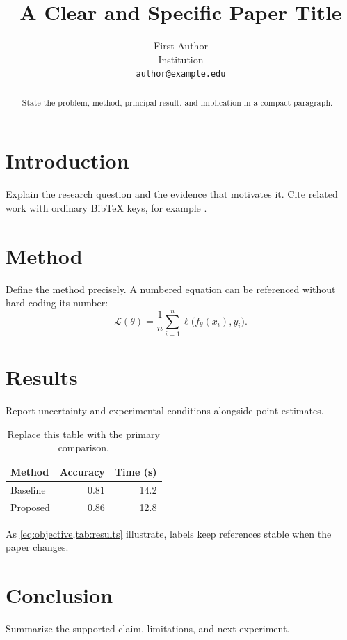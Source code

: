 \documentclass[11pt]{article}
\title{A Clear and Specific Paper Title}
\author{First Author \\ Institution \\ \texttt{author@example.edu}}
\date{}
\begin{document}
\maketitle

\begin{abstract}
State the problem, method, principal result, and implication in a compact
paragraph.
\end{abstract}

\section{Introduction}
\label{sec:introduction}

Explain the research question and the evidence that motivates it. Cite related
work with ordinary BibTeX keys, for example \cite{lamport1994latex}.

\section{Method}
\label{sec:method}

Define the method precisely. A numbered equation can be referenced without
hard-coding its number:
\begin{equation}
  \label{eq:objective}
  \mathcal{L}(\theta) = \frac{1}{n}\sum_{i=1}^{n}
  \ell\bigl(f_{\theta}(x_i), y_i\bigr).
\end{equation}

\section{Results}
\label{sec:results}

Report uncertainty and experimental conditions alongside point estimates.

\begin{table}[t]
  \centering
  \caption{Replace this table with the primary comparison.}
  \label{tab:results}
  \begin{tabular}{lrr}
    \toprule
    Method & Accuracy & Time (s) \\
    \midrule
    Baseline & 0.81 & 14.2 \\
    Proposed & 0.86 & 12.8 \\
    \bottomrule
  \end{tabular}
\end{table}

As \cref{eq:objective,tab:results} illustrate, labels keep references stable
when the paper changes.

\section{Conclusion}

Summarize the supported claim, limitations, and next experiment.



\end{document}
